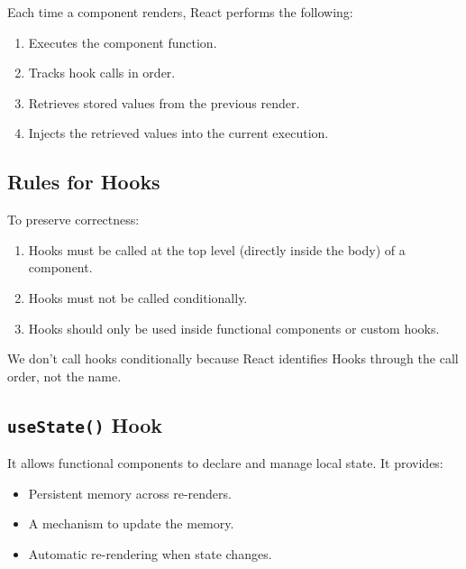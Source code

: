\documentclass[12pt, a4paper]{report}
\begin{document}
     Each time a component renders, React performs the following:
     \begin{enumerate}
        \item Executes the component function.
        \item Tracks hook calls in order.
        \item Retrieves stored values from the previous render.
        \item Injects the retrieved values into the current execution.
    \end{enumerate}

    \subsection{Rules for Hooks}
    To preserve correctness:
    \begin{enumerate}
        \item Hooks must be called at the top level (directly inside the body) of a component.
        \item Hooks must not be called conditionally.
        \item Hooks should only be used inside functional components or custom hooks.
    \end{enumerate}
    We don't call hooks conditionally because React identifies Hooks through the call order, not the name.

    \subsection{\texttt{useState()} Hook}
    It allows functional components to declare and manage local state.
    It provides:
    \begin{itemize}
        \item Persistent memory across re-renders.
        \item A mechanism to update the memory.
        \item Automatic re-rendering when state changes.
    \end{itemize}
\end{document}
